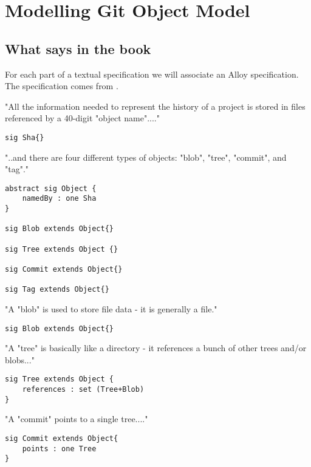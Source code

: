 \section{Modelling Git Object Model}

\subsection{What says in the book \cite{gitComm}}

For each part of a textual 
specification we will associate an Alloy specification.
The specification comes from \cite{gitComm}. \par

"All the information needed to represent the history
of a project is stored in files referenced by a 
40-digit "object name"...."


\begin{lstlisting}
sig Sha{}
\end{lstlisting}

"..and there are four different types of objects: "blob",
"tree", "commit", and "tag"."

\begin{lstlisting}
abstract sig Object {
	namedBy : one Sha
}

sig Blob extends Object{}

sig Tree extends Object {}

sig Commit extends Object{}

sig Tag extends Object{}
\end{lstlisting}

"A "blob" is used to store file data - it is generally
a file."

\begin{lstlisting}
sig Blob extends Object{}
\end{lstlisting}

"A "tree" is basically like a directory - it references a bunch
of other trees and/or blobs..."

\begin{lstlisting}
sig Tree extends Object {
	references : set (Tree+Blob)
}
\end{lstlisting}


"A "commit" points to a single tree...."

\begin{lstlisting}
sig Commit extends Object{
	points : one Tree
}

\end{lstlisting}

